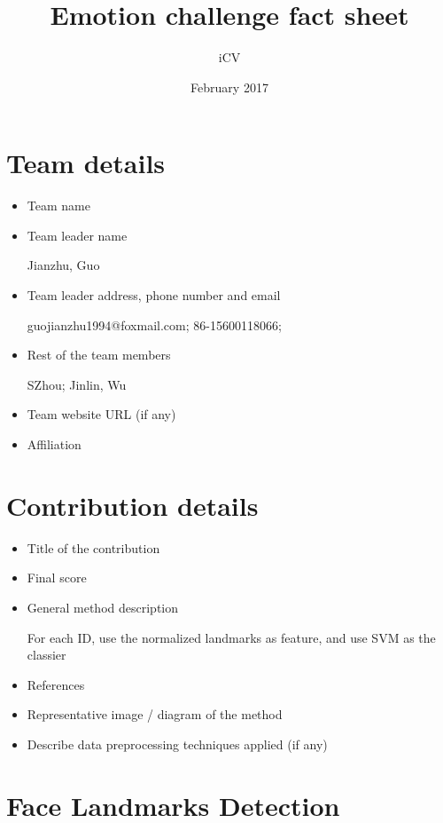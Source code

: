\documentclass{article}
\title{Emotion challenge fact sheet}
\author{iCV}
\date{February 2017}
\begin{document}
\maketitle

\section{Team details}

\begin{itemize}
\item Team name 
                              
\item Team leader name                           

Jianzhu, Guo
\item Team leader address, phone number and email 

guojianzhu1994@foxmail.com; 86-15600118066; 
\item Rest of the team members      

SZhou; Jinlin, Wu
\item Team website URL (if any)                   
\item Affiliation
\end{itemize}

\section{Contribution details}

\begin{itemize}
\item Title of the contribution                                  
\item Final score                                               
\item General method description     

For each ID, use the normalized landmarks as feature, and use SVM as the classier                            
\item References                                               
\item Representative image / diagram of the method             
\item Describe data preprocessing techniques applied (if any)   
\end{itemize}


\section{Face Landmarks Detection}
\end{document}
